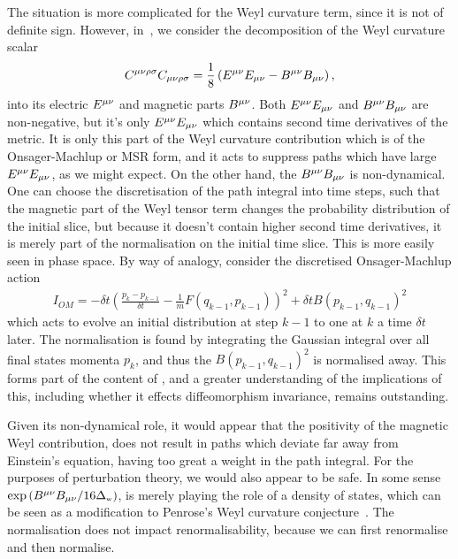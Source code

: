 \documentclass[aps,preprintnumbers,superscriptaddress,longbibliography]{revtex4-1}
\def\WeylTerm{\Delta_{\text{\tiny w}}}
\begin{document}
The situation is more complicated for the Weyl curvature term, since it is not of definite sign. However, in~\cite{UCLnorm2023}, we consider the decomposition of the Weyl curvature scalar
\begin{align}
    C^{\mu\nu\rho\sigma}C_{\mu\nu\rho\sigma}=\frac{1}{8}\left(E^{\mu\nu} E_{\mu\nu} - B^{\mu\nu} B_{\mu\nu}\right),
\end{align}
into its electric $E^{\mu\nu}$ and magnetic parts $B^{\mu\nu}$. Both $E^{\mu\nu} E_{\mu\nu}$ and $B^{\mu\nu} B_{\mu\nu}$ are non-negative, but it's 
only $E^{\mu\nu} E_{\mu\nu}$ which contains second time derivatives of the metric. It is only this part of the Weyl curvature contribution which is of the Onsager-Machlup or MSR form, and it acts to suppress paths which have large $E^{\mu\nu} E_{\mu\nu}$, as we might expect. On the other hand, the $B^{\mu\nu} B_{\mu\nu}$ is non-dynamical. One can choose the discretisation of the path integral into time steps, such that the magnetic part of the Weyl tensor term changes the probability distribution of the initial slice, but because it doesn't contain higher second time derivatives, it is merely part of the normalisation on the initial time slice. This is more easily seen in phase space. By way of analogy, consider the discretised Onsager-Machlup action 
\begin{align}
    I_{OM}=-\delta t \left(\frac{p_k-p_{k-1}}{\delta t}-\frac{1}{m}F(q_{k-1},p_{k-1})\right)^2+\delta t B(p_{k-1},q_{k-1})^2
\end{align}
which acts to evolve an initial distribution at step $k-1$ to one at $k$ a time $\delta t$ later. The normalisation is found by integrating the Gaussian integral over all final states momenta $p_k$, and thus the $B(p_{k-1},q_{k-1})^2$ is normalised away. This forms part of the content of \cite{UCLnorm2023}, and a greater understanding of the implications of this, including whether it effects diffeomorphism invariance, remains outstanding. %



Given its non-dynamical role, it would appear that the positivity of the magnetic Weyl contribution, does not result in paths which deviate far away from Einstein's equation, having too great a weight in the path integral. For the purposes of perturbation theory, we would also appear to be safe. In some sense $\exp\left(B^{\mu\nu}B_{\mu\nu}/16\WeylTerm\right)$, is merely playing the role of a density of states, which can be seen as a modification to Penrose's Weyl curvature conjecture~\cite{penrose1977proc}. The normalisation does not impact renormalisability, because we can first renormalise and then normalise.
\end{document}
